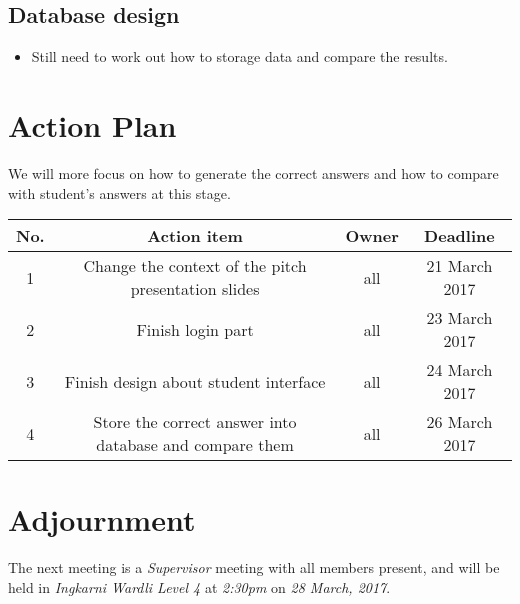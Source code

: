 \documentclass[11pt, a4paper]{article}
\begin{document}
\subsection{Database design}
\begin{itemize}
\item Still need to work out how to storage data and compare the results.
\end{itemize}




\section{Action Plan}
We will more focus on how to generate the correct answers and how to compare with student's answers at this stage.

\vspace{10pt}
\begin{tabular}{|c|c|c|c|}
\hline
No. & Action item & Owner & Deadline \\
\hline
\hline
1 & Change the context of the pitch presentation slides & all & 21 March 2017 \\
\hline
2 & Finish login part & all & 23 March 2017 \\
\hline
3 & Finish design about student interface & all & 24 March 2017 \\
\hline
4 & Store the correct answer into database and compare them & all & 26 March 2017\\
\hline
\end{tabular}

\section{Adjournment}
The next meeting is a \emph{Supervisor} meeting with all members present, and will be held in \emph{Ingkarni Wardli Level 4} at \emph{2:30pm} on \emph{28 March, 2017}.
\end{document}
